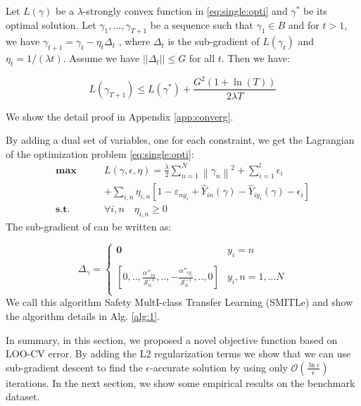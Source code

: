 \begin{theorem}\label{th:single:converg}
	Let $L(\gamma)$ be a $\lambda$-strongly convex function in \eqref{eq:single:opti} and $\gamma^*$ be its optimal solution. Let $\gamma_1,...,\gamma_{T+1}$ be a sequence such that $\gamma_1 \in B$ and for $t>1$, we have $\gamma_{t+1} = \gamma_t - \eta_t \Delta_t$ , where $\Delta_t$ is the sub-gradient of $L(\gamma_t)$ and $\eta_t = 1/(\lambda t)$. Assume we have $||\Delta_t|| \leq G$ for all $t$. Then we have:
	
	\begin{equation}
	L(\gamma_{T+1}) \leq L(\gamma^*)+\frac{G^2(1+\ln (T))}{2\lambda T}
	\end{equation}
\end{theorem}
We show the detail proof in Appendix \ref{app:converg}.

By adding a dual set of variables, one for each constraint, we get the Lagrangian of the optimization problem \eqref{eq:single:opti}:
\begin{equation}\label{eq:single:dual}
\begin{aligned}
\textbf{max}\qquad {}& L\left( {\gamma ,\epsilon ,\eta } \right) =\frac{{{\lambda }}}{2}\sum\limits_{n = 1}^N {{{\left\| {{\gamma _n}} \right\|}^2}}  + \sum\limits_{i = 1}^l {{\epsilon _i}} \\
&+ \sum\limits_{i,n} {{\eta _{i,n}}\left[ {1 - {\varepsilon _{n{y_i}}} + {{\hat Y}_{in}}\left( {\gamma  } \right) - {{\hat Y}_{i{y_i}}}\left( {\gamma } \right) - {\epsilon _i}} \right]}  \\
\textbf{s.t.} \qquad {} & \forall i,n \quad {} {\eta _{i,n}} \ge 0
\end{aligned}
\end{equation}
The sub-gradient of can be written as:

\begin{equation*}
{\Delta _\gamma }=\begin{cases}
\boldsymbol{0}&{y_i}=n\\
\\
\left[ {0,..,\frac{{\alpha ''}_{in}}{\mathcal{S} _{ii}^{ - 1}},.., - \frac{{\alpha ''}_{i{y_i}}}{\mathcal{S} _{ii}^{ - 1}},..,0} \right]&{y_i},n = 1,...N\\
\end{cases}
\end{equation*}
We call this algorithm Safety MultI-class  Transfer Learning (SMITLe) and show the algorithm details in Alg. \ref{alg:1}. 


In summary, in this section, we proposed a novel objective function based on LOO-CV error. By adding the L2 regularization terms we show that we can use sub-gradient descent to find the $\epsilon$-accurate solution by using only $\mathcal{O}\left(\frac{\ln \epsilon}{\epsilon}\right)$ iterations. In the next section, we show some empirical results on the benchmark dataset.
